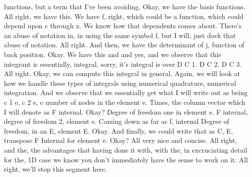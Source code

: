 \documentclass[10pt]{article}
\begin{document}
functions, but a term that I've been avoiding. Okay, we have the basis functions. All right, we have this. We have f, right, which could be a function, which could depend upon c through x. We know how that dependents comes about. There's an abuse of notation in, in using the same symbol f, but I will, just dock that abuse of notation. All right. And then, we have the determinant of j, function of back position. Okay. We have this and and yes, and we observe that this integrant is essentially, integral, sorry, it's integral is over D C 1. D C 2. D C 3. All right. Okay, we can compute this integral in general. Again, we will look at how we handle these types of integrals using numerical quadrature, numerical integration. And we observe that we essentially get what I will write out as being c 1 e, c 2 e, c number of nodes in the element e. Times, the column vector which I will denote as F internal. Okay? Degree of freedom one in element e. F internal, degree of freedom 2, element e. Coming down as far as f, internal Degree of freedom, in an E, element E. Okay. And finally, we could write that as C, E, transpose F Internal for element e. Okay? All very nice and concise. All right, and the, the advantages that having done it with, with the, in excruciating detail for the, 1D case we know you don't immediately have the sense to work on it. All right, we'll stop this segment here.
\end{document}
